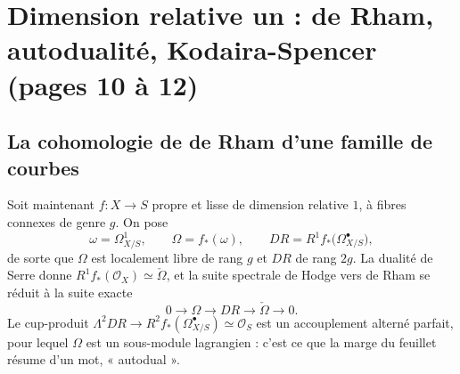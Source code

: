 \documentclass[11pt,a4paper]{article}
\begin{document}
\section*{Dimension relative un : de Rham, autodualité, Kodaira-Spencer (pages 10 à 12)}

\subsection*{La cohomologie de de Rham d'une famille de courbes}

Soit maintenant $f : X \to S$ propre et lisse de dimension relative $1$, à
fibres connexes de genre $g$. On pose
\[
  \omega = \Omega^1_{X/S}, \qquad \Omega = f_*(\omega), \qquad
  DR = R^1 f_*\big( \Omega^\bullet_{X/S} \big),
\]
de sorte que $\Omega$ est localement libre de rang $g$ et $DR$ de rang $2g$.
La dualité de Serre donne $R^1 f_*(\mathcal{O}_X) \simeq \check{\Omega}$, et
la suite spectrale de Hodge vers de Rham se réduit à la suite exacte
\[
  0 \longrightarrow \Omega \longrightarrow DR \longrightarrow
  \check{\Omega} \longrightarrow 0 .
\]
Le cup-produit $\Lambda^2 DR \to R^2 f_*(\Omega^\bullet_{X/S}) \simeq
\mathcal{O}_S$ est un accouplement alterné parfait, pour lequel $\Omega$ est
un sous-module lagrangien : c'est ce que la marge du feuillet résume d'un mot,
« autodual ».
\end{document}
